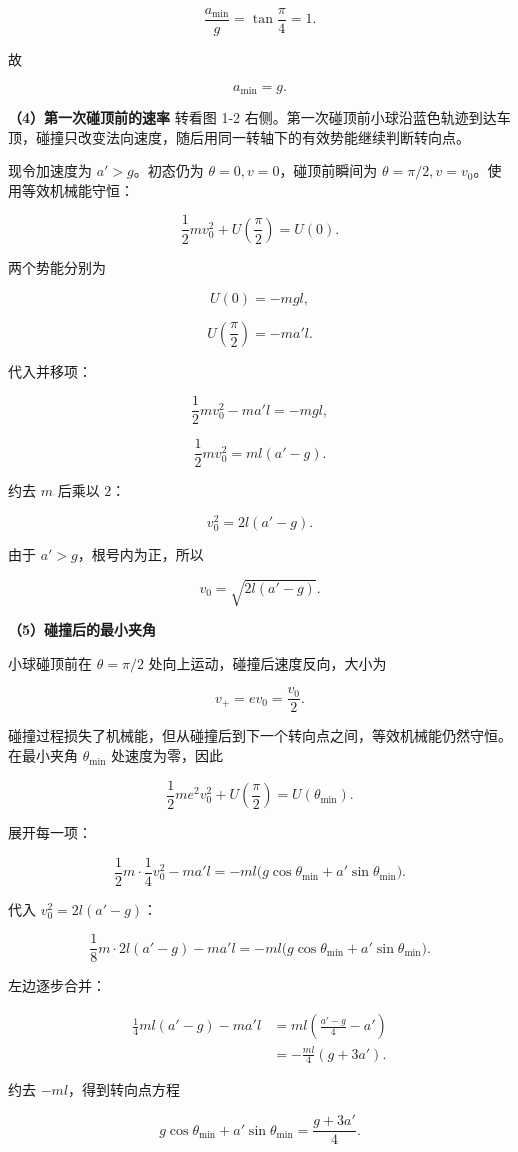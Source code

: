 \documentclass[12pt,a4paper,UTF8]{ctexart}
\begin{document}
\[\frac{a_{\min}}g=\tan\frac\pi4=1.\]

故

\[\boxed{a_{\min}=g}.\]

\textbf{（4）第一次碰顶前的速率} 转看图 1-2
右侧。第一次碰顶前小球沿蓝色轨迹到达车顶，碰撞只改变法向速度，随后用同一转轴下的有效势能继续判断转向点。

现令加速度为 \(a'>g\)。初态仍为 \(\theta=0,v=0\)，碰顶前瞬间为
\(\theta=\pi/2,v=v_0\)。使用等效机械能守恒：

\[\frac12mv_0^2+U\left(\frac\pi2\right)=U(0).\]

两个势能分别为

\[U(0)=-mgl,\]

\[U\left(\frac\pi2\right)=-ma'l.\]

代入并移项：

\[\frac12mv_0^2-ma'l=-mgl,\]

\[\frac12mv_0^2=ml(a'-g).\]

约去 \(m\) 后乘以 \(2\)：

\[v_0^2=2l(a'-g).\]

由于 \(a'>g\)，根号内为正，所以

\[\boxed{v_0=\sqrt{2l(a'-g)}}.\]

\textbf{（5）碰撞后的最小夹角}

小球碰顶前在 \(\theta=\pi/2\) 处向上运动，碰撞后速度反向，大小为

\[v_+=ev_0=\frac{v_0}{2}.\]

碰撞过程损失了机械能，但从碰撞后到下一个转向点之间，等效机械能仍然守恒。在最小夹角
\(\theta_{\min}\) 处速度为零，因此

\[\frac12m e^2v_0^2+U\left(\frac\pi2\right)=U(\theta_{\min}).\]

展开每一项：

\[\frac12m\cdot\frac14v_0^2-ma'l
=-ml\bigl(g\cos\theta_{\min}+a'\sin\theta_{\min}\bigr).\]

代入 \(v_0^2=2l(a'-g)\)：

\[\frac18m\cdot2l(a'-g)-ma'l
=-ml\bigl(g\cos\theta_{\min}+a'\sin\theta_{\min}\bigr).\]

左边逐步合并：

\[\begin{aligned}
\frac14ml(a'-g)-ma'l
&=ml\left(\frac{a'-g}{4}-a'\right)\\
&=-\frac{ml}{4}(g+3a').
\end{aligned}\]

约去 \(-ml\)，得到转向点方程

\[g\cos\theta_{\min}+a'\sin\theta_{\min}
=\frac{g+3a'}4.\]
\end{document}
